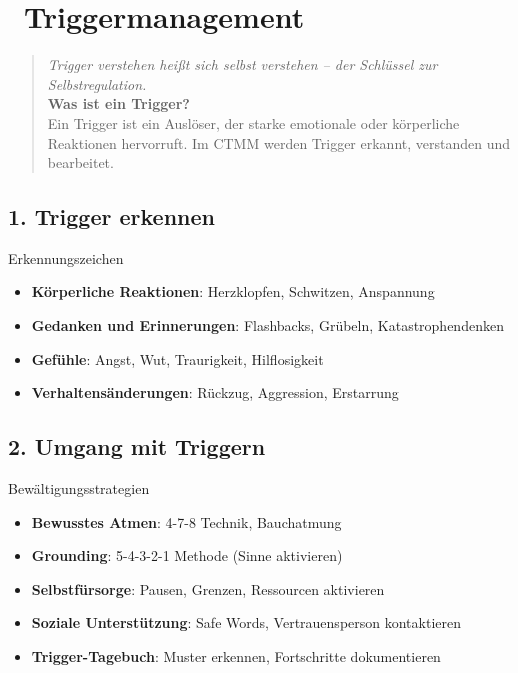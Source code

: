 
\newpage
\section*{\textcolor{ctmmOrange}{\faExclamationCircle~Triggermanagement}}
\label{sec:triggermanagement}

\begin{quote}
\textit{\textcolor{ctmmOrange}{Trigger verstehen heißt sich selbst verstehen -- der Schlüssel zur Selbstregulation.}}\\
\textbf{\textcolor{ctmmOrange}{Was ist ein Trigger?}}\\
Ein Trigger ist ein Auslöser, der starke emotionale oder körperliche Reaktionen hervorruft. Im CTMM werden Trigger erkannt, verstanden und bearbeitet.
\end{quote}

\subsection*{\textcolor{ctmmOrange}{1. Trigger erkennen}}

\begin{ctmmOrangeBox}{Erkennungszeichen}
\begin{itemize}
  \item \textbf{Körperliche Reaktionen}: Herzklopfen, Schwitzen, Anspannung
  \item \textbf{Gedanken und Erinnerungen}: Flashbacks, Grübeln, Katastrophendenken  
  \item \textbf{Gefühle}: Angst, Wut, Traurigkeit, Hilflosigkeit
  \item \textbf{Verhaltensänderungen}: Rückzug, Aggression, Erstarrung
\end{itemize}
\end{ctmmOrangeBox}

\subsection*{\textcolor{ctmmOrange}{2. Umgang mit Triggern}}

\begin{ctmmGreenBox}{Bewältigungsstrategien}
\begin{itemize}
  \item \textbf{Bewusstes Atmen}: 4-7-8 Technik, Bauchatmung
  \item \textbf{Grounding}: 5-4-3-2-1 Methode (Sinne aktivieren)
  \item \textbf{Selbstfürsorge}: Pausen, Grenzen, Ressourcen aktivieren
  \item \textbf{Soziale Unterstützung}: Safe Words, Vertrauensperson kontaktieren
  \item \textbf{Trigger-Tagebuch}: Muster erkennen, Fortschritte dokumentieren
\end{itemize}
\end{ctmmGreenBox}


